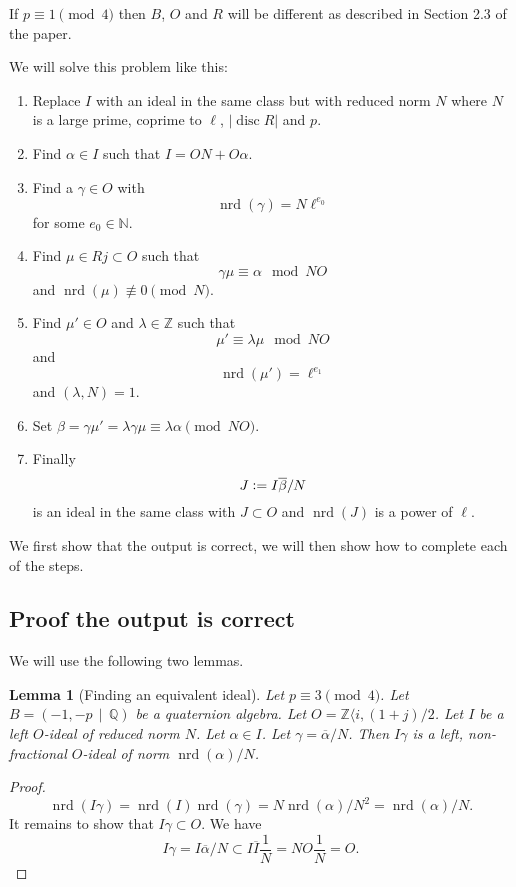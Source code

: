\documentclass[10pt]{article}
\theoremstyle{plain}
\newtheorem{lemma}[theorem]{Lemma}
\theoremstyle{definition}
\newcommand{\op}{\operatorname}
\newcommand{\N}{\mathbb{N}}
\newcommand{\Z}{\mathbb{Z}}
\newcommand{\Q}{\mathbb{Q}}
\newcommand{\nrd}{\op{nrd}}
\newcommand{\disc}{\op{disc}}
\begin{document}
If \( p \equiv 1 \pmod{4} \) then \( B \), \( O \) and \( R \) will be different as described in Section 2.3 of the paper.

We will solve this problem like this:
\begin{enumerate}
    \item
          Replace \( I \) with an ideal in the same class but with reduced norm \( N \) where \( N \) is a large prime, coprime to \( \ell \), \( |\disc R| \) and \( p \).
    \item Find \( \alpha \in I \) such that \( I = ON + O\alpha \).
    \item
          Find a \( \gamma \in O \) with \[ \nrd(\gamma) = N \ell^{e_0} \] for some \( e_0 \in \N \).
    \item
          Find \( \mu \in Rj \subset  O \) such that \[ \gamma\mu \equiv \alpha \mod NO \] and \( \nrd(\mu) \not\equiv 0 \pmod{N} \).
    \item
          Find \( \mu' \in  O \) and \( \lambda \in \Z \) such that \[ \mu' \equiv \lambda \mu \mod NO \] and \[ \nrd(\mu') = \ell^{e_1} \] and \( (\lambda, N) = 1 \).
    \item
          Set \( \beta = \gamma \mu' = \lambda\gamma\mu \equiv \lambda \alpha \pmod{NO} \). %
    \item
          Finally \[ J \vcentcolon = I\overline{\beta}/N \] is an ideal in the same class with \( J \subset O \) and \( \nrd(J) \) is a power of \( \ell \).
\end{enumerate}

We first show that the output is correct, we will then show how to complete each of the steps.

\subsection{Proof the output is correct}
We will use the following two lemmas.
\begin{lemma}[Finding an equivalent ideal]
    Let \( p \equiv 3 \pmod{4} \).
    Let \( B =  (-1, -p \, \mid \, \Q) \) be a quaternion algebra.
    Let \( O = \Z \langle i, (1+j) / 2 \).
    Let \( I \) be a left \( O \)-ideal of reduced norm \( N \).
    Let \( \alpha \in I \).
    Let \( \gamma = \overline{\alpha} / N \).
    Then \( I \gamma \) is a left, non-fractional \( O \)-ideal of norm \( \nrd(\alpha) / N \).
\end{lemma}
\begin{proof}
    \[
        \nrd(I \gamma) = \nrd(I)\nrd(\gamma) = N \nrd(\alpha) / N^2 = \nrd(\alpha) / N.
    \]
    It remains to show that \( I\gamma \subset O \).
    We have
    \[
        I\gamma = I\overline{\alpha} / N \subset I\overline{I} \frac{1}{N} = NO \frac{1}{N} = O.
    \]
\end{proof}
\end{document}
